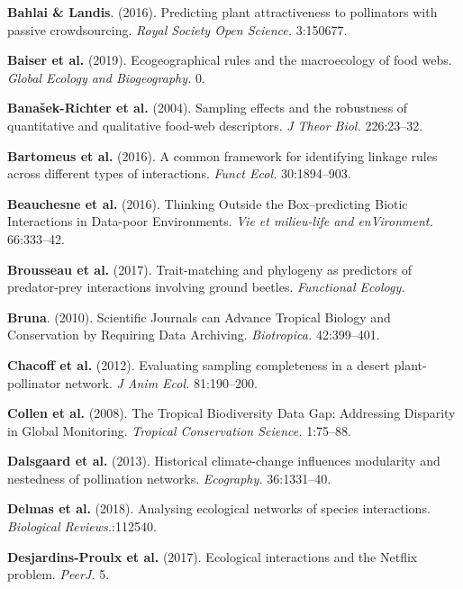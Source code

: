 \leavevmode\hypertarget{ref-BahlLand16}{}%
\textbf{Bahlai \& Landis}. (2016). Predicting plant attractiveness to
pollinators with passive crowdsourcing. \emph{Royal Society Open
Science.} 3:150677.

\leavevmode\hypertarget{ref-BaisGrav19}{}%
\textbf{Baiser et al.} (2019). Ecogeographical rules and the
macroecology of food webs. \emph{Global Ecology and Biogeography.} 0.

\leavevmode\hypertarget{ref-BanaCatt04}{}%
\textbf{Banašek-Richter et al.} (2004). Sampling effects and the
robustness of quantitative and qualitative food-web descriptors. \emph{J
Theor Biol.} 226:23--32.

\leavevmode\hypertarget{ref-BartGrav16}{}%
\textbf{Bartomeus et al.} (2016). A common framework for identifying
linkage rules across different types of interactions. \emph{Funct Ecol.}
30:1894--903.

\leavevmode\hypertarget{ref-BeauDesj16}{}%
\textbf{Beauchesne et al.} (2016). Thinking Outside the Box--predicting
Biotic Interactions in Data-poor Environments. \emph{Vie et milieu-life
and enVironment.} 66:333--42.

\leavevmode\hypertarget{ref-BrouGrav17}{}%
\textbf{Brousseau et al.} (2017). Trait-matching and phylogeny as
predictors of predator-prey interactions involving ground beetles.
\emph{Functional Ecology.}

\leavevmode\hypertarget{ref-Brun10}{}%
\textbf{Bruna}. (2010). Scientific Journals can Advance Tropical Biology
and Conservation by Requiring Data Archiving. \emph{Biotropica.}
42:399--401.

\leavevmode\hypertarget{ref-ChacVazq12}{}%
\textbf{Chacoff et al.} (2012). Evaluating sampling completeness in a
desert plant-pollinator network. \emph{J Anim Ecol.} 81:190--200.

\leavevmode\hypertarget{ref-CollRam08}{}%
\textbf{Collen et al.} (2008). The Tropical Biodiversity Data Gap:
Addressing Disparity in Global Monitoring. \emph{Tropical Conservation
Science.} 1:75--88.

\leavevmode\hypertarget{ref-DalsTroj13}{}%
\textbf{Dalsgaard et al.} (2013). Historical climate-change influences
modularity and nestedness of pollination networks. \emph{Ecography.}
36:1331--40.

\leavevmode\hypertarget{ref-DelmBess18}{}%
\textbf{Delmas et al.} (2018). Analysing ecological networks of species
interactions. \emph{Biological Reviews.}:112540.

\leavevmode\hypertarget{ref-DesjLaig17}{}%
\textbf{Desjardins-Proulx et al.} (2017). Ecological interactions and
the Netflix problem. \emph{PeerJ.} 5.

